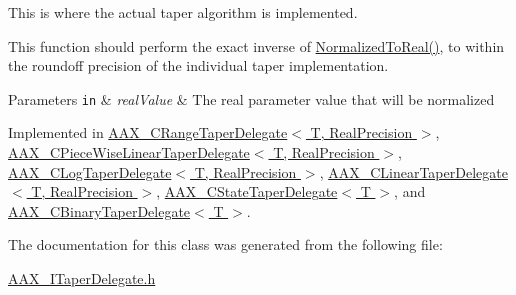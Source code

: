 This is where the actual taper algorithm is implemented.

This function should perform the exact inverse of \hyperlink{a00114_a0aea0765b42855205bfab84673a2de33}{Normalized\+To\+Real()}, to within the roundoff precision of the individual taper implementation.


\begin{DoxyParams}[1]{Parameters}
\mbox{\tt in}  & {\em real\+Value} & The real parameter value that will be normalized \\
\hline
\end{DoxyParams}


Implemented in \hyperlink{a00038_a457a42ac3e78debf4c595ac1afeec7cf}{A\+A\+X\+\_\+\+C\+Range\+Taper\+Delegate$<$ T, Real\+Precision $>$}, \hyperlink{a00037_a5882df4a8f80ca2a88b512e87e7b36bc}{A\+A\+X\+\_\+\+C\+Piece\+Wise\+Linear\+Taper\+Delegate$<$ T, Real\+Precision $>$}, \hyperlink{a00023_abcc5e51eebe04ff347de512a103880de}{A\+A\+X\+\_\+\+C\+Log\+Taper\+Delegate$<$ T, Real\+Precision $>$}, \hyperlink{a00022_a7949f3c1608fd85848ac4c09c0107690}{A\+A\+X\+\_\+\+C\+Linear\+Taper\+Delegate$<$ T, Real\+Precision $>$}, \hyperlink{a00041_af693a54c4a61ebc507fcc1a212585824}{A\+A\+X\+\_\+\+C\+State\+Taper\+Delegate$<$ T $>$}, and \hyperlink{a00013_aa27dfc33b38aef729c4cd499d90317a1}{A\+A\+X\+\_\+\+C\+Binary\+Taper\+Delegate$<$ T $>$}.



The documentation for this class was generated from the following file\+:\begin{DoxyCompactItemize}
\item 
\hyperlink{a00262}{A\+A\+X\+\_\+\+I\+Taper\+Delegate.\+h}\end{DoxyCompactItemize}

